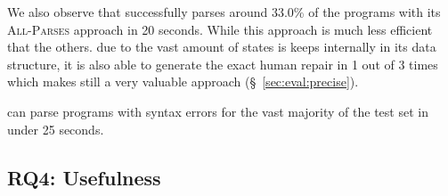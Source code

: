We also observe that \toolname successfully parses around 33.0\% of the programs
with its \textsc{All-Parses} approach in 20 seconds. While this approach is much
less efficient that the others. due to the vast amount of states is keeps
internally in its data structure, it is also able to generate the exact human
repair in 1 out of 3 times which makes still a very valuable approach
(\S~\ref{sec:eval:precise}).

\begin{framed}
  \noindent \toolname can parse programs with syntax errors for the vast
  majority of the test set in under 25 seconds.
\end{framed}

\subsection{RQ4: Usefulness}
\label{sec:eval:useful}
